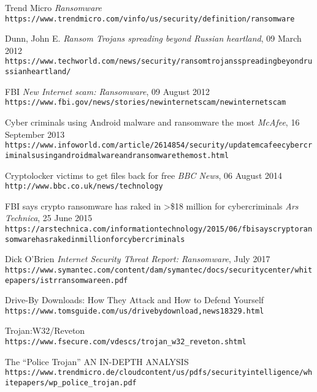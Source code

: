 \documentclass[10pt,a4paper]{article}
\begin{document}
\begin{thebibliography}{1}

Trend Micro
\textit{Ransomware}
\\\texttt{https://www.trendmicro.com/vinfo/us/security/definition/ransomware}

Dunn, John E.
\textit{Ransom Trojans spreading beyond Russian heartland}, 09 March 2012
\\\texttt{https://www.techworld.com/news/security/ransom\-trojans\-spreading\-beyond\-russian\-heartland/}

FBI
\textit{New Internet scam: Ransomware}, 09 August 2012
\\\texttt{https://www.fbi.gov/news/stories/new\-internet\-scam/new\-internet\-scam}

Cyber criminals using Android malware and ransomware the most
\textit{McAfee}, 16 September 2013
\\\texttt{https://www.infoworld.com/article/2614854/security/update\-\-mcafee\-\-cyber\-criminals\-using\-android\-malware\-and\-ransomware\-the\-most.html}

Cryptolocker victims to get files back for free
\textit{BBC News}, 06 August 2014
\\\texttt{http://www.bbc.co.uk/news/technology}

FBI says crypto ransomware has raked in >\$18 million for cybercriminals
\textit{Ars Technica}, 25 June 2015
\\\texttt{https://arstechnica.com/information\-technology/2015/06/fbi\-says\-crypto\-ransomware\-has\-raked\-in\-million\-for\-cybercriminals}

Dick O’Brien
\textit{Internet Security Threat Report: Ransomware}, July 2017
\\\texttt{https://www.symantec.com/content/dam/symantec/docs/security\-center/white\-papers/istr\-ransomware\-en.pdf}

Drive-By Downloads: How They Attack and How to Defend Yourself
\\\texttt{https://www.tomsguide.com/us/driveby\-download,news\-18329.html}

Trojan:W32/Reveton
\\\texttt{https://www.f\-secure.com/v\-descs/trojan\_w32\_reveton.shtml}

The “Police Trojan”
AN IN-DEPTH ANALYSIS
\\\texttt{https://www.trendmicro.de/cloud\-content/us/pdfs/security\-intelligence/white\-papers/wp\_police\_trojan.pdf}


\end{thebibliography}
\end{document}
